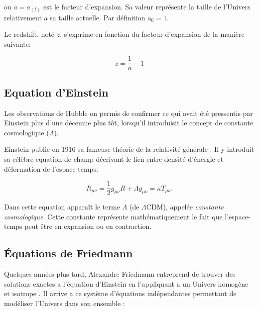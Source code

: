 ou $a = a_{(t)}$ est le facteur d'expansion.
Sa valeur représente la taille de l'Univers relativement a sa taille actuelle.
Par définition $a_0 = 1$.

Le redshift, noté $z$, s'exprime en fonction du facteur d'expansion de la manière suivante:

\begin{equation}
z= \frac{1}{a}-1
\end{equation}

\subsection{Equation d'Einstein}

Les observations de Hubble on permis de confirmer ce qui avait été pressentis par Einstein plus d'une décennie plus tôt, lorsqu'il introduisit le concept de constante cosmologique ($\Lambda$). 

Einstein publie en 1916 sa fameuse théorie de la relativité générale \citep{1916AnP...354..769E}.
Il y introduit sa célèbre equation de champ décrivant le lien entre densité d'énergie et déformation de l'espace-temps:

\begin{equation}
R_{\mu\nu} = \frac{1}{2} g_{\mu\nu}R + \Lambda g_{\mu\nu}  = \kappa T_{\mu\nu}.
\label{eq:einstein}
\end{equation} 

Dans cette equation apparaît le terme $\Lambda$ (de $\Lambda$CDM), appelée \textit{constante cosmologique}.
Cette constante représente mathématiquement le fait que l'espace-temps peut être en expansion ou en contraction.


\subsection{Équations de Friedmann}



Quelques années plus tard, Alexandre Friedmann entreprend de trouver des solutions exactes a l'équation d'Einstein en l'appliquant a un Univers homogène et isotrope \citep{1922ZPhy...10..377F}.
Il arrive a ce système d'équations indépendantes permettant de modéliser l'Univers dans son ensemble :

% 
%
% 
 
